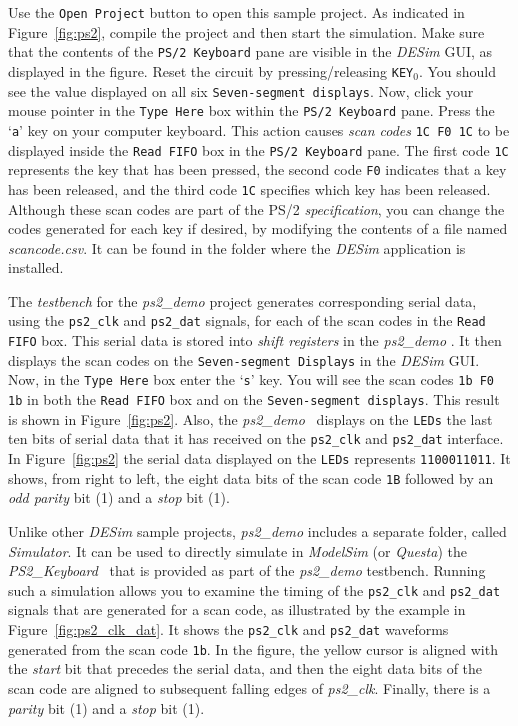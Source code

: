 {Use the \texttt{Open Project} button to open this sample project. As indicated in 
Figure~\ref{fig:ps2}, compile the project and then start the simulation. Make sure that
the contents of the \texttt{PS/2 Keyboard} pane are visible in the {\it DESim} GUI, as 
displayed in the figure. Reset the circuit by pressing/releasing \texttt{KEY}$_0$.
You should see the value  displayed on all six \texttt{Seven-segment displays}. 
Now, click your mouse pointer in the
\texttt{Type Here} box within the \texttt{PS/2 Keyboard} pane.  Press the `\texttt{a}' key
on your computer keyboard. This action causes {\it scan codes} \texttt{1C F0 1C} to be 
displayed inside the \texttt{Read FIFO} box in the \texttt{PS/2 Keyboard} pane. The first
code \texttt{1C} represents the key that has been pressed, the second code \texttt{F0} indicates
that a key has been released, and the third code \texttt{1C} specifies which key has
been released. Although these scan codes are part of the PS/2 {\it specification}, you can
change the codes generated for each key if desired, by modifying the contents of a file
named {\it scancode.csv}. It can be found in the folder where the {\it DESim} application
is installed. 

The {\it testbench} for the {\it ps2\_demo} project generates corresponding serial data, using
the \texttt{ps2\_clk} and \texttt{ps2\_dat} signals, for each of the scan codes in the 
\texttt{Read FIFO} box. This serial data is stored into {\it shift registers} in the 
{\it ps2\_demo} \hdlModuleName. It then displays the scan codes on the 
\texttt{Seven-segment Displays} in the {\it DESim} GUI. Now, in the \texttt{Type Here} box 
enter the `\texttt{s}' key. You will see the scan codes
\texttt{1b F0 1b} in both the \texttt{Read FIFO} box and on the 
\texttt{Seven-segment displays}. This result is shown in Figure~\ref{fig:ps2}.
Also, the {\it ps2\_demo} \hdlModuleName~displays on the \texttt{LEDs} the last ten bits of 
serial data that it has received on the \texttt{ps2\_clk} and \texttt{ps2\_dat} interface. 
In Figure~\ref{fig:ps2} the serial data displayed on the
\texttt{LEDs} represents \texttt{1100011011}. It shows, from right to left, the eight data
bits of the scan code \texttt{1B} followed by an {\it odd parity} bit (1) and a {\it stop}
bit (1).

Unlike other {\it DESim} sample projects, {\it ps2\_demo} includes a separate folder, 
called {\it Simulator}. It can be used to directly simulate in {\it ModelSim} (or {\it Questa}) 
the {\it PS2\_Keyboard} \hdlModuleName~that is provided as part of the {\it ps2\_demo} 
testbench. Running such a simulation allows you to examine the timing of the 
\texttt{ps2\_clk} and \texttt{ps2\_dat} signals that are generated for a scan code, as
illustrated by the example in Figure~\ref{fig:ps2_clk_dat}. It shows the \texttt{ps2\_clk} 
and \texttt{ps2\_dat} waveforms generated from the scan code \texttt{1b}. In the figure,
the yellow cursor is aligned with the {\it start} bit that precedes the serial data, and
then the eight data bits of the scan code are aligned to subsequent falling edges
of {\it ps2\_clk}. Finally, there is a {\it parity} bit (1) and a {\it stop} bit (1). 

}
